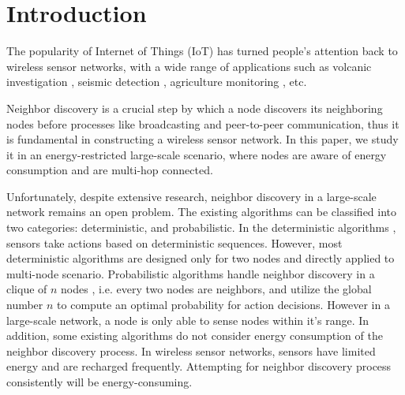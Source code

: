 \section{Introduction}








The popularity of Internet of Things (IoT) has turned people's attention back to wireless sensor networks\cite{akyildiz2002wireless}, with a wide range of applications such as volcanic investigation \cite{werner2006deploying}, seismic detection \cite{suzuki2007high}, agriculture monitoring \cite{wang2010l3sn}, etc. 

Neighbor discovery is a crucial step by which a node discovers its neighboring nodes before processes like broadcasting and peer-to-peer communication, thus it is fundamental in constructing a wireless sensor network. In this paper, we study it in an energy-restricted large-scale scenario, where nodes are aware of energy consumption and  are multi-hop connected.

Unfortunately, despite extensive research, neighbor discovery in a large-scale network remains an open problem.
The existing algorithms can be classified into two categories: deterministic, and probabilistic.
In the deterministic algorithms \cite{dutta2008practical, kandhalu2010u, bakht2012searchlight, sun2014hello,  chen2015heterogeneous}, sensors take actions based on deterministic sequences.
However, most deterministic algorithms are designed only for two nodes and directly applied to multi-node scenario. Probabilistic algorithms handle neighbor discovery in a clique of $n$ nodes\cite{mcglynn2001birthday, vasudevan2009neighbor, you2011aloha, song2014probabilistic} , i.e. every two nodes are neighbors, and utilize the global number $n$ to compute an optimal probability for action decisions. However in a large-scale network, a node is only able to sense nodes within it's range. In addition, some existing algorithms \cite{mcglynn2001birthday,vasudevan2009neighbor} do not consider energy consumption of the neighbor discovery process. In wireless sensor networks, sensors have limited energy and are recharged frequently. Attempting for neighbor discovery process consistently will be energy-consuming. 

